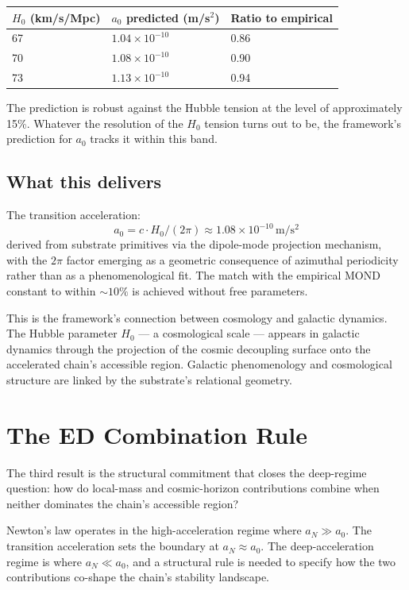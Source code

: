 \documentclass[11pt,a4paper]{article}
\begin{document}
\begin{center}
\small
\begin{tabular}{@{}lll@{}}
\toprule
$H_0$ (km/s/Mpc) & $a_0$ predicted (m/s$^2$) & Ratio to empirical \\
\midrule
67 & $1.04 \times 10^{-10}$ & 0.86 \\
70 & $1.08 \times 10^{-10}$ & 0.90 \\
73 & $1.13 \times 10^{-10}$ & 0.94 \\
\bottomrule
\end{tabular}
\end{center}

The prediction is robust against the Hubble tension at the level of approximately 15\%. Whatever the resolution of the $H_0$ tension turns out to be, the framework's prediction for $a_0$ tracks it within this band.

\subsection{What this delivers}

The transition acceleration:
\[
a_{0} = c \cdot H_{0} / (2\pi) \approx 1.08 \times 10^{-10}\, \mathrm{m/s^2}
\]
derived from substrate primitives via the dipole-mode projection mechanism, with the $2\pi$ factor emerging as a geometric consequence of azimuthal periodicity rather than as a phenomenological fit. The match with the empirical MOND constant to within $\sim 10\%$ is achieved without free parameters.

This is the framework's connection between cosmology and galactic dynamics. The Hubble parameter $H_0$ --- a cosmological scale --- appears in galactic dynamics through the projection of the cosmic decoupling surface onto the accelerated chain's accessible region. Galactic phenomenology and cosmological structure are linked by the substrate's relational geometry.

\section{The ED Combination Rule}

The third result is the structural commitment that closes the deep-regime question: how do local-mass and cosmic-horizon contributions combine when neither dominates the chain's accessible region?

Newton's law operates in the high-acceleration regime where $a_N \gg a_0$. The transition acceleration sets the boundary at $a_N \approx a_0$. The deep-acceleration regime is where $a_N \ll a_0$, and a structural rule is needed to specify how the two contributions co-shape the chain's stability landscape.
\end{document}
